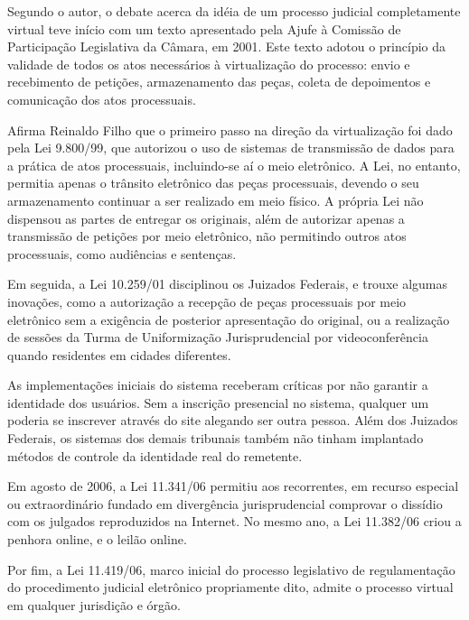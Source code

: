 	Segundo o autor, o debate acerca da idéia de um processo
  judicial completamente virtual teve início com um texto
  apresentado pela Ajufe à Comissão de Participação Legislativa
  da Câmara, em 2001. Este texto adotou o princípio da validade
  de todos os atos necessários à virtualização do processo: envio
  e recebimento de petições, armazenamento das peças, coleta de
  depoimentos e comunicação dos atos processuais.\par
	
	Afirma Reinaldo Filho que o primeiro passo na direção da
  virtualização foi dado pela Lei 9.800/99, que autorizou o uso
  de sistemas de transmissão de dados para a prática de atos
  processuais, incluindo-se aí o meio eletrônico. A Lei, no
  entanto, permitia apenas o trânsito eletrônico das peças
  processuais, devendo o seu armazenamento continuar a ser
  realizado em meio físico. A própria Lei não dispensou as partes
  de entregar os originais, além de autorizar apenas a
  transmissão de petições por meio eletrônico, não permitindo
  outros atos processuais, como audiências e sentenças.\par
	
	Em seguida, a Lei 10.259/01 disciplinou os Juizados Federais, e
  trouxe algumas inovações, como a autorização a recepção de
  peças processuais por meio eletrônico sem a exigência de
  posterior apresentação do original, ou a realização de sessões
  da Turma de Uniformização Jurisprudencial por videoconferência
  quando residentes em cidades diferentes. \par
	
	As implementações iniciais do sistema receberam críticas por
  não garantir a identidade dos usuários. Sem a inscrição
  presencial no sistema, qualquer um poderia se inscrever através
  do site alegando ser outra pessoa. Além dos Juizados Federais,
      os sistemas dos demais tribunais também não tinham
      implantado métodos de controle da identidade real do
      remetente.\par
	
	Em agosto de 2006, a Lei 11.341/06 permitiu aos recorrentes, em
  recurso especial ou extraordinário fundado em divergência
  jurisprudencial comprovar o dissídio com os julgados
  reproduzidos na Internet. No mesmo ano, a Lei 11.382/06 criou a
  penhora online, e o leilão online. \par
	
	Por fim, a Lei 11.419/06, marco inicial do processo legislativo
  de regulamentação do procedimento judicial eletrônico
  propriamente dito, admite o processo virtual em qualquer
  jurisdição e órgão. \par
